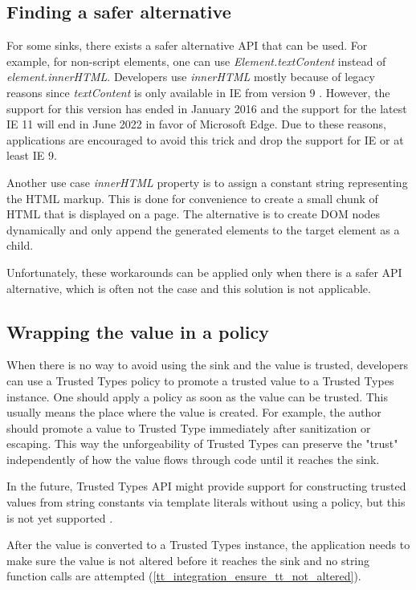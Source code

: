 \subsection{Finding a safer alternative}

For some sinks, there exists a safer alternative API that can be used. For example, for non-script
elements, one can use \emph{Element.textContent} instead of \emph{element.innerHTML}. Developers use
\emph{innerHTML} mostly because of legacy reasons since \emph{textContent} is only available in IE
from version 9 \cite{text_content_mdn}. However, the support for this version has ended in January
2016 and the support for the latest IE 11 will end in June 2022 in favor of Microsoft Edge. Due to
these reasons, applications are encouraged to avoid this trick and drop the support for IE or at
least IE 9.

Another use case \emph{innerHTML} property is to assign a constant string representing the HTML
markup. This is done for convenience to create a small chunk of HTML that is displayed on a page.
The alternative is to create DOM nodes dynamically and only append the generated elements to the
target element as a child.

Unfortunately, these workarounds can be applied only when there is a safer API alternative, which is
often not the case and this solution is not applicable.

\subsection{Wrapping the value in a policy}

When there is no way to avoid using the sink and the value is trusted, developers can use a Trusted
Types policy to promote a trusted value to a Trusted Types instance. One should apply a policy as
soon as the value can be trusted. This usually means the place where the value is created. For
example, the author should promote a value to Trusted Type immediately after sanitization or
escaping. This way the unforgeability of Trusted Types can preserve the "trust" independently of how
the value flows through code until it reaches the sink.

In the future, Trusted Types API might provide support for constructing trusted values from string
constants via template literals without using a policy, but this is not yet supported
\cite{tt_from_literal_method}.

After the value is converted to a Trusted Types instance, the application needs to make sure the
value is not altered before it reaches the sink and no string function calls are attempted
(\ref{tt_integration_ensure_tt_not_altered}).


